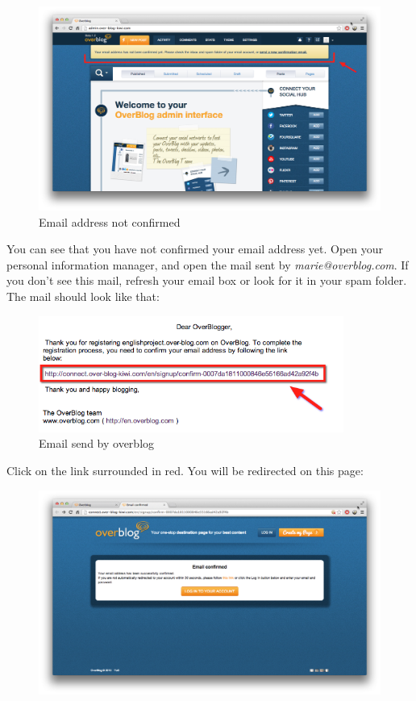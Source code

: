 \documentclass[a4paper,10pt]{article}
\begin{document}
\begin{enumerate}
\begin{figure}[H]
	\includegraphics[width=13cm]{Images/addressMailNotConfirmed.png}
    \caption{Email address not confirmed}
\end{figure}
You can see that you have not confirmed your email address yet. Open your personal information manager, and open the mail sent by \emph{marie@overblog.com}. If you don't see this mail, refresh your email box or look for it in your spam folder. The mail should look like that: 
\begin{figure}[H]
    \center
	\includegraphics[width=10cm]{Images/emailOverblog.png}
    \caption{Email send by overblog}
\end{figure}
Click on the link surrounded in red. You will be redirected on this page:
\begin{figure}[H]
    \center
	\includegraphics[width=13cm]{Images/addressMailConfirmed.png}

\end{figure}
\end{enumerate}
\end{document}

